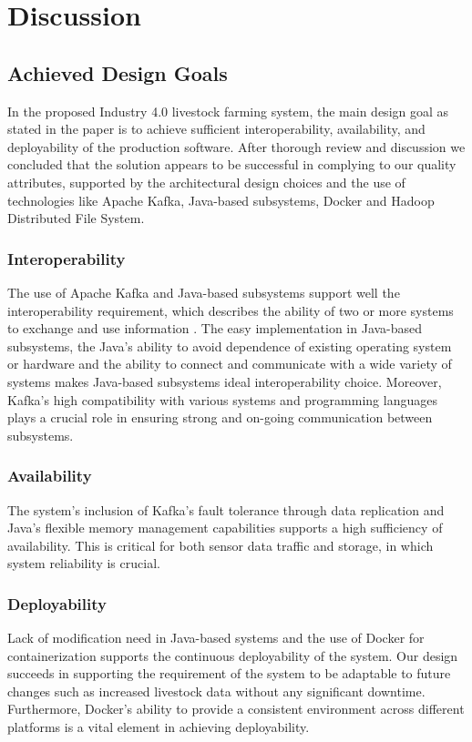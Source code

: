 \documentclass[conference]{IEEEtran}
\begin{document}
\section{Discussion}
\subsection{Achieved Design Goals}
In the proposed Industry 4.0 livestock farming system, the main design goal as stated in the paper is to achieve sufficient interoperability, availability, and deployability of the production software. After thorough review and discussion we concluded that the solution appears to be successful in complying to our quality attributes, supported by the architectural design choices and the use of technologies like Apache Kafka, Java-based subsystems, Docker and Hadoop Distributed File System.

\subsubsection{Interoperability}
The use of Apache Kafka and Java-based subsystems support well the interoperability requirement, which describes the ability of two or more systems to exchange and use information \cite{Brownsword2004}. The easy implementation in Java-based subsystems, the Java's ability to avoid dependence of existing operating system or hardware and the ability to connect and communicate with a wide variety of systems makes Java-based subsystems ideal interoperability choice. Moreover, Kafka's high compatibility with various systems and programming languages plays a crucial role in ensuring strong and on-going communication between subsystems.

\subsubsection{Availability}
The system's inclusion of Kafka's fault tolerance through data replication and Java's flexible memory management capabilities supports a high sufficiency of availability. This is critical for both sensor data traffic and storage, in which system reliability is crucial.

\subsubsection{Deployability}
Lack of modification need in Java-based systems and the use of Docker for containerization supports the continuous deployability of the system. Our design succeeds in supporting the requirement of the system to be adaptable to future changes such as increased livestock data without any significant downtime. Furthermore, Docker's ability to provide a consistent environment across different platforms is a vital element in achieving deployability.
\end{document}
